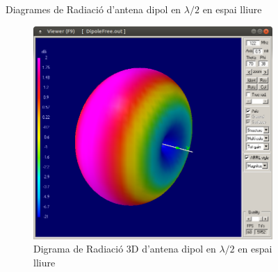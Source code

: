 \begin{figure}[H]
\begin{subfigure}[b]{0.32\textwidth}
	  \caption{}
	  \label{1diag2}
	  \end{subfigure}
	  \vspace{10pt}
	\caption{Diagrames de Radiació d'antena dipol en $\lambda/2$ en espai lliure}
	\label{diag1}
	\end{figure}

	\begin{figure}[H]
	\centering
	  \begin{subfigure}[b]{0.53\textwidth}
	  \includegraphics[width=\textwidth]{./images/1.Dypole_Free/1_3d.png}
	  \caption{Digrama de Radiació 3D d'antena dipol en $\lambda/2$ en espai lliure}
	  \label{1diag3d}
	  \end{subfigure}
	  \qquad %
	  \begin{subfigure}[b]{0.32\textwidth}

\end{subfigure}
\end{figure}
